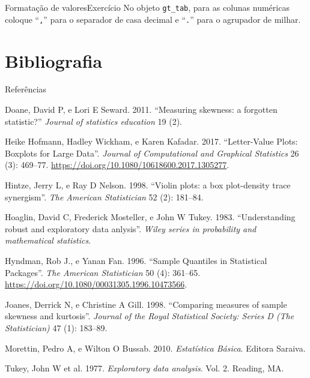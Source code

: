 \documentclass[
  10pt,
  ignorenonframetext,
]{beamer}
\newlength{\cslhangindent}
\newlength{\cslentryspacingunit} %
\newenvironment{CSLReferences}[2] %
 {%
  \setlength{\parindent}{0pt}
  \ifodd #1
  \let\oldpar\par
  \def\par{\hangindent=\cslhangindent\oldpar}
  \fi
  \setlength{\parskip}{#2\cslentryspacingunit}
 }%
 {}
\begin{document}
\begin{frame}[fragile]{Formatação de valores\newline Exercício}
\protect\hypertarget{formatauxe7uxe3o-de-valoresexercuxedcio}{}
No objeto \texttt{gt\_tab}, para as colunas numéricas coloque
``\texttt{,}'' para o separador de casa decimal e ``\texttt{.}'' para o
agrupador de milhar.
\end{frame}

\hypertarget{bibliografia}{%
\section{Bibliografia}\label{bibliografia}}

\begin{frame}{Referências}
\protect\hypertarget{referuxeancias}{}
\hypertarget{refs}{}
\begin{CSLReferences}{1}{0}
\leavevmode{}%
Doane, David P, e Lori E Seward. 2011. {``Measuring skewness: a
forgotten statistic?''} \emph{Journal of statistics education} 19 (2).

\leavevmode{}%
Heike Hofmann, Hadley Wickham, e Karen Kafadar. 2017. {``Letter-Value
Plots: Boxplots for Large Data''}. \emph{Journal of Computational and
Graphical Statistics} 26 (3): 469--77.
\url{https://doi.org/10.1080/10618600.2017.1305277}.

\leavevmode{}%
Hintze, Jerry L, e Ray D Nelson. 1998. {``Violin plots: a box
plot-density trace synergism''}. \emph{The American Statistician} 52
(2): 181--84.

\leavevmode{}%
Hoaglin, David C, Frederick Mosteller, e John W Tukey. 1983.
{``Understanding robust and exploratory data anlysis''}. \emph{Wiley
series in probability and mathematical statistics}.

\leavevmode{}%
Hyndman, Rob J., e Yanan Fan. 1996. {``Sample Quantiles in Statistical
Packages''}. \emph{The American Statistician} 50 (4): 361--65.
\url{https://doi.org/10.1080/00031305.1996.10473566}.

\leavevmode{}%
Joanes, Derrick N, e Christine A Gill. 1998. {``Comparing measures of
sample skewness and kurtosis''}. \emph{Journal of the Royal Statistical
Society: Series D (The Statistician)} 47 (1): 183--89.

\leavevmode{}%
Morettin, Pedro A, e Wilton O Bussab. 2010. \emph{Estatística Básica}.
Editora Saraiva.

\leavevmode{}%
Tukey, John W et al. 1977. \emph{Exploratory data analysis}. Vol. 2.
Reading, MA.

\end{CSLReferences}
\end{frame}
\end{document}
